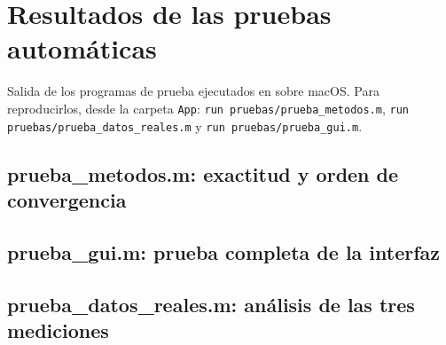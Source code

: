 \section{Resultados de las pruebas automáticas}
\label{app:pruebas}

Salida de los programas de prueba ejecutados en \matlab{} sobre macOS. Para reproducirlos, desde la carpeta \texttt{App}: \texttt{run pruebas/prueba\_metodos.m}, \texttt{run pruebas/prueba\_datos\_reales.m} y \texttt{run pruebas/prueba\_gui.m}.

\subsection*{prueba\_metodos.m: exactitud y orden de convergencia}


\subsection*{prueba\_gui.m: prueba completa de la interfaz}


\subsection*{prueba\_datos\_reales.m: análisis de las tres mediciones}

